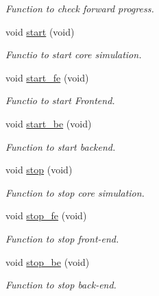 \begin{DoxyCompactItemize}
\begin{DoxyCompactList}\small\item\em Function to check forward progress. \item\end{DoxyCompactList}\item 
void \hyperlink{classcore__c_a2adbcd4d399f1e06dc5b33bcc30c7d81}{start} (void)
\begin{DoxyCompactList}\small\item\em Functio to start core simulation. \item\end{DoxyCompactList}\item 
void \hyperlink{classcore__c_a785aa5db0ef52e6db7ecf485f034f848}{start\_\-fe} (void)
\begin{DoxyCompactList}\small\item\em Functio to start Frontend. \item\end{DoxyCompactList}\item 
void \hyperlink{classcore__c_a2ec973b0acfda3feaad60b0224c64daa}{start\_\-be} (void)
\begin{DoxyCompactList}\small\item\em Function to start backend. \item\end{DoxyCompactList}\item 
void \hyperlink{classcore__c_a243a14ca2beed86a23de46ed3274f78f}{stop} (void)
\begin{DoxyCompactList}\small\item\em Function to stop core simulation. \item\end{DoxyCompactList}\item 
void \hyperlink{classcore__c_aeb3acdc09564f11d8677bace00a84574}{stop\_\-fe} (void)
\begin{DoxyCompactList}\small\item\em Function to stop front-\/end. \item\end{DoxyCompactList}\item 
void \hyperlink{classcore__c_aaaab9447065cacd3bf4a1fef213cca83}{stop\_\-be} (void)
\begin{DoxyCompactList}\small\item\em Function to stop back-\/end. \item\end{DoxyCompactList}\item 

\end{DoxyCompactItemize}
